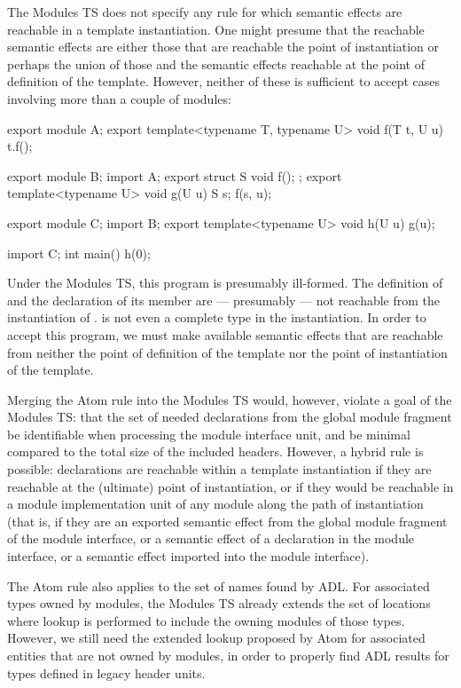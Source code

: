 \pnum
The Modules TS does not specify any rule for which semantic effects
are reachable in a template instantiation.
One might presume that the reachable semantic effects
are either those that are reachable the point of instantiation
or perhaps the union of those and the semantic effects
reachable at the point of definition of the template.
However, neither of these is sufficient to accept
cases involving more than a couple of modules:

\begin{codeblock}
export module A;
export template<typename T, typename U> void f(T t, U u) {
  t.f();
}
\end{codeblock}

\begin{codeblock}
export module B;
import A;
export struct S { void f(); };
export template<typename U> void g(U u) { S s; f(s, u); }
\end{codeblock}

\begin{codeblock}
export module C;
import B;
export template<typename U> void h(U u) { g(u); }
\end{codeblock}

\begin{codeblock}
import C;
int main() { h(0); }
\end{codeblock}

Under the Modules TS, this program is presumably ill-formed.
The definition of  and
the declaration of its member 
are --- presumably --- not reachable from the instantiation
of .
 is not even a complete type in the instantiation.
In order to accept this program, we must make available
semantic effects that are reachable from neither
the point of definition of the template nor
the point of instantiation of the template.

\pnum
Merging the Atom rule into the Modules TS would, however,
violate a goal of the Modules TS:
that the set of needed declarations from the global module fragment
be identifiable when processing the module interface unit,
and be minimal compared to the total size of the included headers.
However, a hybrid rule is possible:
declarations are reachable within a template instantiation if
they are reachable at the (ultimate) point of instantiation,
or if they would be reachable in a module implementation unit
of any module along the path of instantiation
(that is, if they are an exported semantic effect from
the global module fragment of the module interface, or
a semantic effect of a declaration in the module interface, or
a semantic effect imported into the module interface).

\pnum
The Atom rule also applies to the set of names found by ADL.
For associated types owned by modules,
the Modules TS already extends the set of locations where lookup is performed
to include the owning modules of those types.
However, we still need the extended lookup proposed by Atom
for associated entities that are not owned by modules,
in order to properly find ADL results
for types defined in legacy header units.
